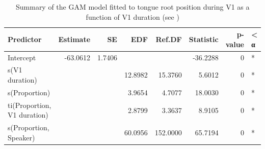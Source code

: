 \documentclass[preprint]{JASAnew}
\begin{document}
\begin{table}

\caption{\label{tab:tra-gam-ar-2-table}Summary of the GAM model fitted to tongue root position during V1 as a function of V1 duration (see )}
\centering
\fontsize{10}{12}\selectfont
\begin{tabular}[t]{lrrrrrrl}
\toprule
Predictor & Estimate & SE & EDF & Ref.DF & Statistic & p-value & < α\\
\midrule
Intercept & -63.0612 & 1.7406 &  &  & -36.2288 & 0 & *\\
s(V1 duration) &  &  & 12.8982 & 15.3760 & 5.6012 & 0 & *\\
s(Proportion) &  &  & 3.9654 & 4.7077 & 18.0030 & 0 & *\\
ti(Proportion, V1 duration) &  &  & 2.8799 & 3.3637 & 8.9105 & 0 & *\\
s(Proportion, Speaker) &  &  & 60.0956 & 152.0000 & 65.7194 & 0 & *\\
\bottomrule
\end{tabular}
\end{table}










\end{document}
